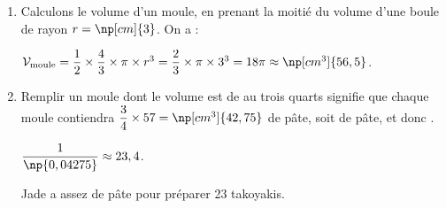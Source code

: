 
\medskip

\begin{enumerate}
	\item Calculons le volume d'un moule, en prenant la moitié du volume d'une boule de rayon $r = \np[cm]{3}$. On a :
	
$\mathcal{V}_\text{moule} = \dfrac{1}{2} \times \dfrac{4}{3}\times \pi \times r^3 = \dfrac{2}{3} \times \pi \times 3^3 = 18\pi \approx \np[cm^3]{56,5}$.
	
	\item Remplir un moule dont le volume est de  au trois quarts signifie que chaque moule contiendra $\dfrac{3}{4}\times 57 = \np[cm^3]{42,75}$ de pâte, soit  de pâte, et donc .
	
$\dfrac{1}{\np{0,04275}} \approx 23,4$.
	
Jade a assez de pâte pour préparer 23 takoyakis.
	
\end{enumerate}



